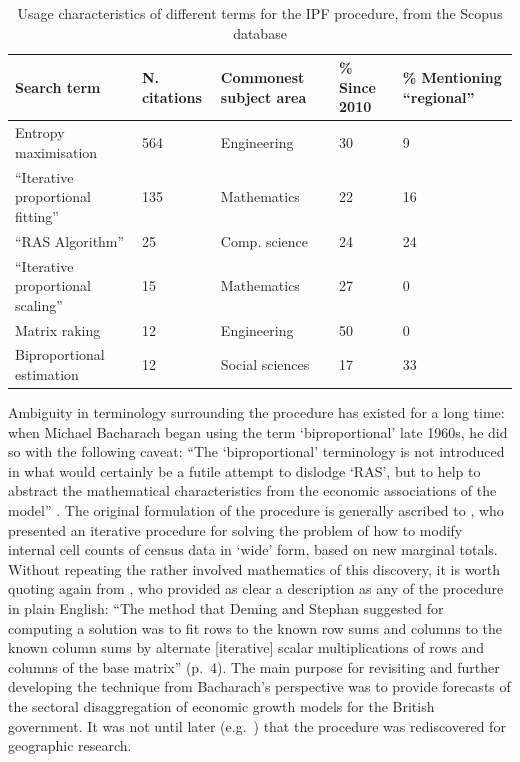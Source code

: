 \documentclass[a4paper,10pt]{article}
\begin{document}
\begin{table}[htbp]
\caption{Usage characteristics of different terms for the IPF procedure, from the Scopus database}
\begin{tabular}{lp{1.5cm}p{2.5cm}p{1.5cm}p{2.5cm}}
\toprule
Search term & N. citations & Commonest subject area & \% Since 2010 & \% Mentioning ``regional'' \\
\midrule
Entropy maximisation & 564 & Engineering & 30 & 9 \\
``Iterative proportional fitting''  & 135 & Mathematics & 22\ & 16 \\
``RAS Algorithm'' & 25 & Comp. science & 24 & 24 \\
``Iterative proportional scaling'' & 15 & Mathematics & 27 & 0 \\
Matrix raking & 12 & Engineering & 50 & 0 \\
Biproportional estimation & 12 & Social sciences & 17 & 33 \\
\bottomrule
\end{tabular}
\label{tterms}
\end{table}

Ambiguity in terminology surrounding the procedure has existed for a long time:
when Michael Bacharach began using the term `biproportional' late 1960s, he did so with the
following caveat: ``The `biproportional' terminology is not introduced in what
would certainly be a futile attempt to dislodge `RAS', but to help to abstract the
mathematical characteristics from the economic associations of the model'' \citep{bacharach1970biproportional}.
The original formulation of the procedure is generally ascribed to \citet{Deming1940},
who presented an iterative procedure for solving the problem of how to modify internal cell counts
of census data in `wide' form, based on new marginal totals. Without repeating
the rather involved mathematics of this discovery, it is worth quoting again from
\citet{bacharach1970biproportional}, who provided as clear a description as any of the procedure
in plain English: ``The method that Deming and Stephan suggested for
computing a solution was to fit rows to the known row sums and columns to the known
column sums by alternate [iterative] scalar multiplications of rows and columns of the
base matrix'' (p.~4). The main purpose for revisiting and further developing the technique
from Bacharach's perspective was to provide forecasts of the sectoral disaggregation of
economic growth models for the British government. It was not until later
(e.g.~\citealp{Holm1987}) that the procedure was rediscovered for geographic research.
\end{document}
